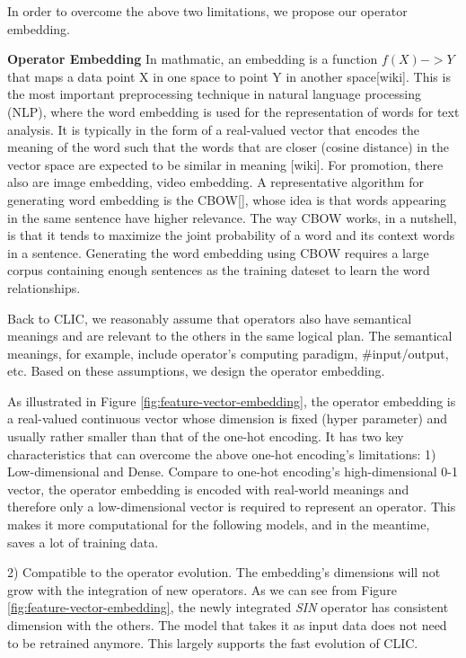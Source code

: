 In order to overcome the above two limitations, we propose our operator embedding.

\textbf{Operator Embedding}
In mathmatic, an embedding is a function $f(X) -> Y$ that maps a data point X in one space to point Y in another space[wiki]. 
This is the most important preprocessing technique in natural language processing (NLP), where the word embedding is used for the representation of words for text analysis. 
It is typically in the form of a real-valued vector that encodes the meaning of the word such that the words that are closer (cosine distance) in the vector space are expected to be similar in meaning [wiki]. 
For promotion, there also are image embedding, video embedding. 
A representative algorithm for generating word embedding is the CBOW[], whose idea is that words appearing in the same sentence have higher relevance. 
The way CBOW works, in a nutshell, is that it tends to maximize the joint probability of a word and its context words in a sentence. 
Generating the word embedding using CBOW requires a large corpus containing enough sentences as the training dateset to learn the word relationships.

Back to CLIC, we reasonably assume that operators also have semantical meanings and are relevant to the others in the same logical plan.
The semantical meanings, for example, include operator's computing paradigm, \#input/output, etc.
Based on these assumptions, we design the operator embedding.

As illustrated in Figure \ref{fig:feature-vector-embedding}, 
the operator embedding is a real-valued continuous vector whose dimension is fixed (hyper parameter) and usually rather smaller than that of the one-hot encoding.
It has two key characteristics that can overcome the above one-hot encoding's limitations:
1) Low-dimensional and Dense. 
Compare to one-hot encoding's high-dimensional 0-1 vector, 
the operator embedding is encoded with real-world meanings and therefore only a low-dimensional vector is required to represent an operator.
This makes it more computational for the following models, and in the meantime, saves a lot of training data.

2) Compatible to the operator evolution. The embedding's dimensions will not grow with the integration of new operators. 
As we can see from Figure \ref{fig:feature-vector-embedding}, the newly integrated \textit{SIN} operator has consistent dimension with the others.
The model that takes it as input data does not need to be retrained anymore. 
This largely supports the fast evolution of CLIC.


